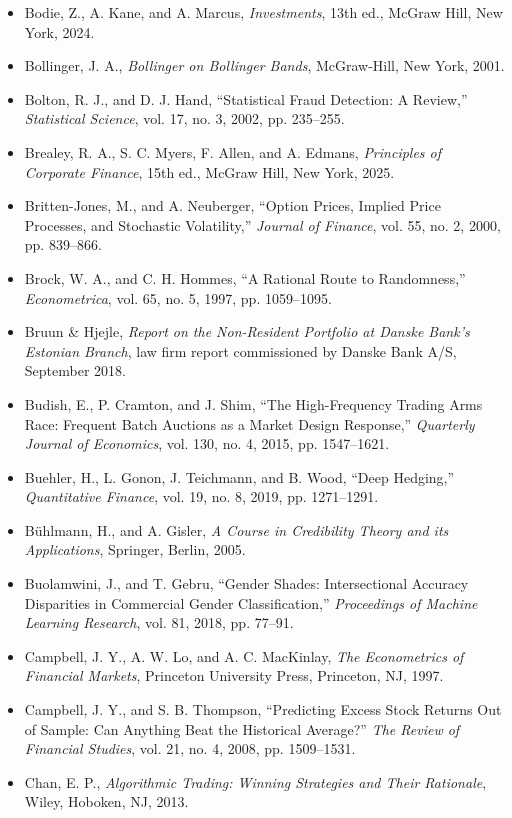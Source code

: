 \documentclass{book}
\begin{document}
\begin{itemize}
    \item Bodie, Z., A. Kane, and A. Marcus, \emph{Investments}, 13th ed., McGraw Hill, New York, 2024.
    \item Bollinger, J. A., \emph{Bollinger on Bollinger Bands}, McGraw-Hill, New York, 2001.
    \item Bolton, R. J., and D. J. Hand, ``Statistical Fraud Detection: A Review,'' \emph{Statistical Science}, vol. 17, no. 3, 2002, pp. 235--255.
    \item Brealey, R. A., S. C. Myers, F. Allen, and A. Edmans, \emph{Principles of Corporate Finance}, 15th ed., McGraw Hill, New York, 2025.
    \item Britten-Jones, M., and A. Neuberger, ``Option Prices, Implied Price Processes, and Stochastic Volatility,'' \emph{Journal of Finance}, vol. 55, no. 2, 2000, pp. 839--866.
    \item Brock, W. A., and C. H. Hommes, ``A Rational Route to Randomness,'' \emph{Econometrica}, vol. 65, no. 5, 1997, pp. 1059--1095.
    \item Bruun \& Hjejle, \emph{Report on the Non-Resident Portfolio at Danske Bank's Estonian Branch}, law firm report commissioned by Danske Bank A/S, September 2018.
    \item Budish, E., P. Cramton, and J. Shim, ``The High-Frequency Trading Arms Race: Frequent Batch Auctions as a Market Design Response,'' \emph{Quarterly Journal of Economics}, vol. 130, no. 4, 2015, pp. 1547--1621.
    \item Buehler, H., L. Gonon, J. Teichmann, and B. Wood, ``Deep Hedging,'' \emph{Quantitative Finance}, vol. 19, no. 8, 2019, pp. 1271--1291.
    \item B{\"u}hlmann, H., and A. Gisler, \emph{A Course in Credibility Theory and its Applications}, Springer, Berlin, 2005.
    \item Buolamwini, J., and T. Gebru, ``Gender Shades: Intersectional Accuracy Disparities in Commercial Gender Classification,'' \emph{Proceedings of Machine Learning Research}, vol. 81, 2018, pp. 77--91.
    \item Campbell, J. Y., A. W. Lo, and A. C. MacKinlay, \emph{The Econometrics of Financial Markets}, Princeton University Press, Princeton, NJ, 1997.
    \item Campbell, J. Y., and S. B. Thompson, ``Predicting Excess Stock Returns Out of Sample: Can Anything Beat the Historical Average?'' \emph{The Review of Financial Studies}, vol. 21, no. 4, 2008, pp. 1509--1531.
    \item Chan, E. P., \emph{Algorithmic Trading: Winning Strategies and Their Rationale}, Wiley, Hoboken, NJ, 2013.

\end{itemize}
\end{document}
